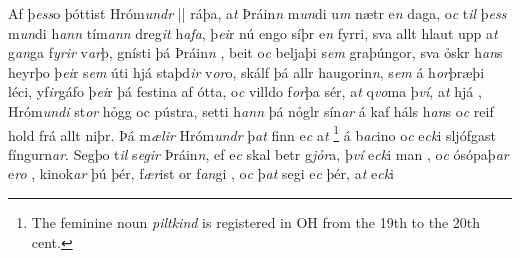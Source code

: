 Af þ\textit{ess}o þóttist Hróm\textit{undr} 
||
 ráþa, a\textit{t} Þráin\textit{n} m\textit{un}di   u\textit{m} nætr e\textit{n}  daga, o\textit{c} t\textit{il} þ\textit{ess} m\textit{un}di h\textit{ann} tím\textit{an}\textit{n}
dreg\textit{it} h\textit{afa},   þ\textit{ei}r nú   engo  síþr e\textit{n} fyrri, sva allt   hlaut   upp a\textit{t}
g\textit{an}ga   f\textit{yrir} v\textit{ar}þ,   gnísti   þá Þráin\textit{n} 
, 
beit o\textit{c}   beljaþi   s\textit{em} graþúngor,  
sva ỏskr h\textit{an}s heyrþo þ\textit{ei}r s\textit{em} úti hjá staþd\textit{ir} v\textit{or}o,  
skálf þá allr haugorin\textit{n}, s\textit{em} á h\textit{or}þræþi léci, yf\textit{ir}gáfo
þ\textit{ei}r þá festina  af ótta, o\textit{c} villdo   f\textit{or}þa    sér,  
 a\textit{t} q\textit{vo}ma   þ\textit{ví}, a\textit{t}  hjá ,   Hróm\textit{undi} st\textit{or} hỏgg oc pústra, 
setti h\textit{ann} þá  nỏglr sín\textit{ar} á   kaf    háls h\textit{an}s o\textit{c} reif   hold   frá   allt   niþr. Þá m\textit{ælir} Hróm\textit{undr} þ\textit{at} finn e\textit{c} a\textit{t} \footnote{The feminine noun \textit{piltkind} is registered in OH from the 19th to the 20th cent.}   á b\textit{ac}ino o\textit{c} e\textit{ck}i  sljófgast   fíngurn\textit{ar}. 
Segþo t\textit{il} s\textit{egir} Þráin\textit{n}, ef
e\textit{c} skal betr g\textit{jỏr}a, þ\textit{ví} e\textit{ck}i 
man  , o\textit{c} ósópaþ\textit{ar} e\textit{ro} ,   kinok\textit{ar}  þú þér,   f\textit{ær}ist   or f\textit{an}gi  , o\textit{c} þ\textit{at} segi e\textit{c} þér, a\textit{t} e\textit{ck}i

